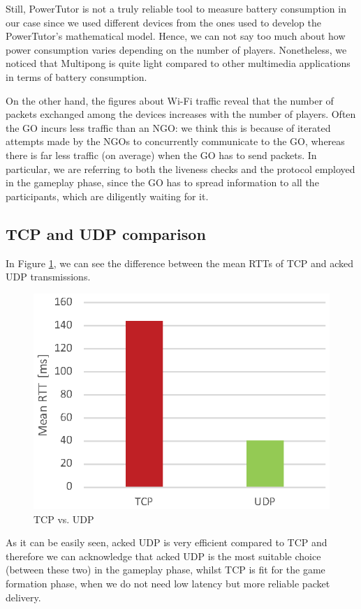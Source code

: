 Still, PowerTutor is not a truly reliable tool to measure battery consumption in
our case since we used different devices from the ones used to develop the
PowerTutor's mathematical model. Hence, we can not say too much about how power
consumption varies depending on the number of players. Nonetheless, we noticed
that Multipong is quite light compared to other multimedia applications in
terms of battery consumption.


On the other hand, the figures about Wi-Fi traffic reveal that the number of
packets exchanged among the devices increases with the number of players. Often
the GO incurs less traffic than an NGO: we think this is because of iterated
attempts made by the NGOs to concurrently communicate to the GO, whereas
there is far less traffic (on average) when the GO has to send packets. In
particular, we are referring to both the liveness checks and the protocol
employed in the gameplay phase, since the GO has to spread information to all
the participants, which are diligently waiting for it.

\subsection{TCP and UDP comparison}

In Figure \ref{fig:TCP-UDP}, we can see the difference between the mean RTTs of
TCP and acked UDP transmissions.

\begin{figure}[H]
  \centering
  \includegraphics[width=.8\columnwidth]{img/UDPvsTCP-RTT.eps}
  \caption{TCP vs. UDP}
  \label{fig:TCP-UDP}
\end{figure}

As it can be easily seen, acked UDP is very efficient compared to TCP and
therefore we can acknowledge that acked UDP is the most suitable choice (between
these two) in the gameplay phase, whilst TCP is fit for the game formation
phase, when we do not need low latency but more reliable packet delivery.
